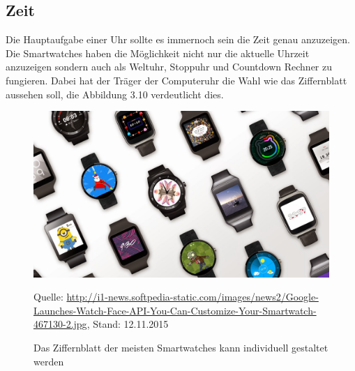 \subsection{Zeit}
Die Hauptaufgabe einer Uhr sollte es immernoch sein die Zeit genau anzuzeigen. Die Smartwatches haben die Möglichkeit nicht nur die aktuelle Uhrzeit anzuzeigen sondern auch als Weltuhr, Stoppuhr und Countdown Rechner zu fungieren. Dabei hat der Träger der Computeruhr die Wahl wie das Ziffernblatt aussehen soll, die Abbildung 3.10 verdeutlicht dies.
\begin{figure}[H]
  \centering
  \includegraphics[scale=0.3]{98_Bilder/03_Marktsegmente/smartwatchfaces}
  \caption[Smartwatch Ziffernblätter]{Das Ziffernblatt der meisten Smartwatches kann individuell gestaltet werden}
  \footnotesize Quelle: \url{http://i1-news.softpedia-static.com/images/news2/Google-Launches-Watch-Face-API-You-Can-Customize-Your-Smartwatch-467130-2.jpg}, Stand: 12.11.2015
\end{figure}

